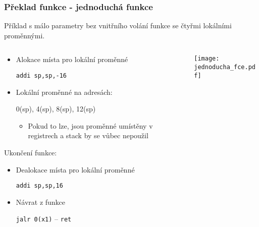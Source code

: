 \documentclass{beamer}
\begin{document}
\begin{frame}
\frametitle{Překlad funkce - jednoduchá funkce}

Příklad s málo parametry bez vnitřního volání funkce se čtyřmi lokálními proměnnými.
\begin{columns}
\begin{column}{0.65\textwidth}
\begin{itemize}
 \item Alokace místa pro lokální proměnné 
 
 \texttt{addi  sp,sp,-16}
 \item Lokální proměnné na adresách: 
 
 0(sp), 4(sp), 8(sp), 12(sp)
\begin{itemize}
 \item Pokud to lze, jsou proměnné umístěny v registrech a stack by se vůbec nepoužil
\end{itemize}
\end{itemize}

Ukončení funkce:
\begin{itemize}
 \item Dealokace místa pro lokální proměnné 
 
 \texttt{addi  sp,sp,16}
 \item Návrat z funkce 
 
 \texttt{jalr 0(x1)} -- \texttt{ret} 
\end{itemize}
\end{column}
\begin{column}{0.35\textwidth}  
\texttt{[image: jednoducha\_fce.pdf]}
\end{column}
\end{columns}

\end{frame}
\end{document}
